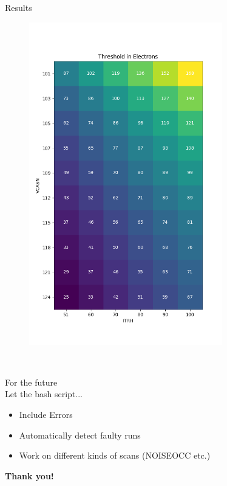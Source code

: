 \begin{frame}{Results}
\begin{minipage}{.49\textwidth}
\begin{figure}[H]
	\includegraphics[width=0.75\textwidth]{bb3_Heatmap_corrected.png}
    \end{figure}
    \end{minipage}\\[.5cm]
\end{frame}

\begin{frame}
    \Large For the future \\[.5cm]
    \normalsize Let the bash script...
    \begin{itemize}
	\item Include Errors
	    \pause
	\item Automatically detect faulty runs
	    \pause
	\item Work on different kinds of scans (NOISEOCC etc.)\\[1cm]
    \end{itemize}
    \pause
    \centering \huge \color{blue!30!black} \textbf{Thank you!}
\end{frame}
